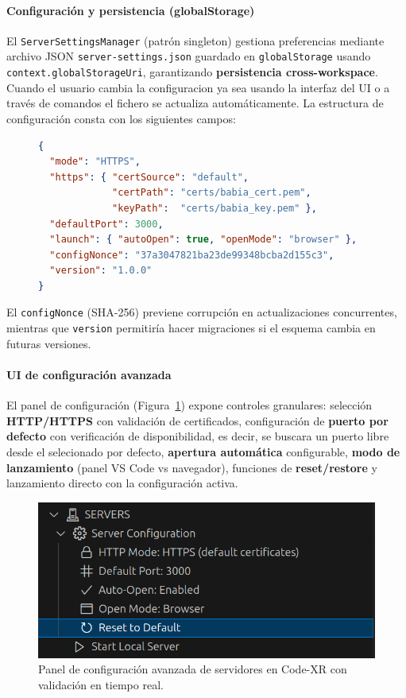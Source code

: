 \documentclass[a4paper, 12pt]{book}
\begin{document}
\paragraph{Configuración y persistencia (globalStorage)}
El \texttt{ServerSettingsManager} (patrón singleton) gestiona preferencias mediante archivo JSON \texttt{server-settings.json} guardado en \texttt{globalStorage} usando \texttt{context.globalStorageUri}, garantizando \textbf{persistencia cross-workspace}. Cuando el usuario cambia la configuracion ya sea usando la interfaz del UI o a través de comandos el fichero se actualiza automáticamente. La estructura de configuración consta con los siguientes campos:

\begin{figure}[H]
\centering
\begin{minipage}{0.9\linewidth}
\begin{lstlisting}[language=json,
caption={Ejemplo del archivo \texttt{server-settings.json} que persiste la configuración de servidores en Code-XR.},
label={fig:server-settings-json}]
{
  "mode": "HTTPS",
  "https": { "certSource": "default",
             "certPath": "certs/babia_cert.pem",
             "keyPath":  "certs/babia_key.pem" },
  "defaultPort": 3000,
  "launch": { "autoOpen": true, "openMode": "browser" },
  "configNonce": "37a3047821ba23de99348bcba2d155c3",
  "version": "1.0.0"
}
\end{lstlisting}
\end{minipage}
\end{figure}


El \texttt{configNonce} (SHA-256) previene corrupción en actualizaciones concurrentes, mientras que \texttt{version} permitiría hacer migraciones si el esquema cambia en futuras versiones.

\paragraph{UI de configuración avanzada}
El panel de configuración (Figura~\ref{fig:ui-server-config}) expone controles granulares: selección \textbf{HTTP/HTTPS} con validación de certificados, configuración de \textbf{puerto por defecto} con verificación de disponibilidad, es decir, se buscara un puerto libre desde el selecionado por defecto, \textbf{apertura automática} configurable, \textbf{modo de lanzamiento} (panel VS Code vs navegador), funciones de \textbf{reset/restore} y lanzamiento directo con la configuración activa.

\begin{figure}[H]
\centering
\includegraphics[width=0.55\linewidth]{img/ui-server-config.png}
\caption{Panel de configuración avanzada de servidores en Code-XR con validación en tiempo real.}
\label{fig:ui-server-config}
\end{figure}
\end{document}
